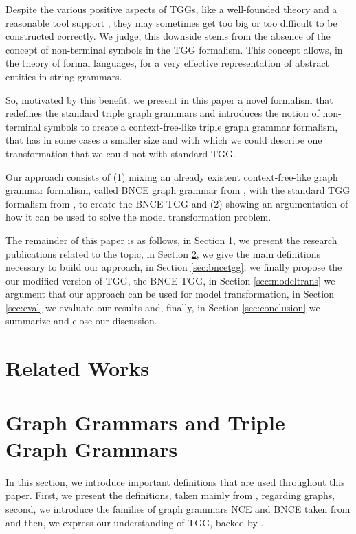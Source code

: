 \documentclass[runningheads]{llncs}
\begin{document}

Despite the various positive aspects of TGGs, like a well-founded theory and a reasonable tool support \cite{anjorin201620}, they may sometimes get too big or too difficult to be constructed correctly. We judge, this downside stems from the absence of the concept of non-terminal symbols in the TGG formalism. This concept allows, in the theory of formal languages, for a very effective representation of abstract entities in string grammars.

So, motivated by this benefit, we present in this paper a novel formalism that redefines the standard triple graph grammars and introduces the notion of non-terminal symbols to create a context-free-like triple graph grammar formalism, that has in some cases a smaller size and with which we could describe one transformation that we could not with standard TGG.

Our approach consists of (1) mixing an already existent context-free-like graph grammar formalism, called BNCE graph grammar from \cite{janssens1982graph}, with the standard TGG formalism from \cite{schurr1994specification}, to create the BNCE TGG and (2) showing an argumentation of how it can be used to solve the model transformation problem.

The remainder of this paper is as follows, in Section \ref{sec:rw}, we present the research publications related to the topic, in Section \ref{sec:gg-tgg}, we give the main definitions necessary to build our approach, in Section \ref{sec:bncetgg}, we finally propose the our modified version of TGG, the BNCE TGG, in Section \ref{sec:modeltrans} we argument that our approach can be used for model transformation, in Section \ref{sec:eval} we evaluate our results and, finally, in Section \ref{sec:conclusion} we summarize and close our discussion.


\section{Related Works}
\label{sec:rw}

\section{Graph Grammars and Triple Graph Grammars}
\label{sec:gg-tgg}
In this section, we introduce important definitions that are used throughout this paper. First, we present the definitions, taken mainly from \cite{rozenberg1986boundary}, regarding graphs, second, we introduce the families of graph grammars NCE and BNCE taken from \cite{janssens1982graph} and then, we express our understanding of TGG, backed by \cite{schurr1994specification}.
\end{document}
